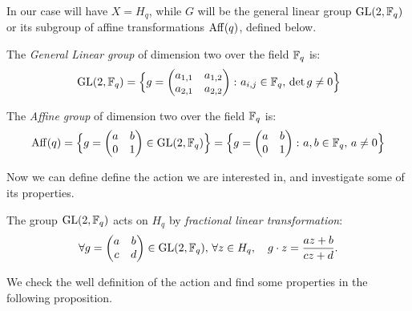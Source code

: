 In our case will have $X=H_q$, while $G$ will be the general linear group $\operatorname{GL}(2,{\mathbb F}_q)$ or its subgroup of
affine transformations $\operatorname{Aff} (q)$, defined below.
\begin{defn}
	The {\it General Linear group} of dimension two over the field ${\mathbb F}_q$ is:
	\begin{equation*}
	\operatorname{GL}(2,{\mathbb F}_q)=\Big\{ g=\begin{pmatrix} a_{1,1} & a_{1,2} \\ a_{2,1} & a_{2,2} \end{pmatrix} \colon a_{i,j} \in {\mathbb F}_q,\, \det g \neq 0 \Big\}
	\end{equation*}	
\end{defn}
\begin{defn}
	The {\it Affine group} of dimension two over the field ${\mathbb F}_q$ is:
	\begin{equation*}
	\operatorname{Aff} (q)=\Big\{ g=\begin{pmatrix} a & b \\ 0 & 1 \end{pmatrix}\in \operatorname{GL}(2,{\mathbb F}_q) \Big\}=\Big\{ g=\begin{pmatrix} a & b \\ 0 & 1 \end{pmatrix} \colon a,b \in {\mathbb F}_q, \, a \neq 0 \Big \}
	\end{equation*}
\end{defn}
Now we can define define the action we are interested in, and investigate some of its properties.
\begin{defn}\label{flt}
The group $\operatorname{GL}(2,{\mathbb F}_q)$ acts on $H_q$ by {\it fractional linear transformation}:
\begin{equation}
	\forall g= \begin{pmatrix} a & b \\ c & d \end{pmatrix}\in \operatorname{GL}(2,{\mathbb F}_q),\, \forall z \in H_q, \quad g \cdot z = \frac{az+b}{cz+d}.
\end{equation}
\end{defn}

We check the well definition of the action and find some properties in the following proposition.

